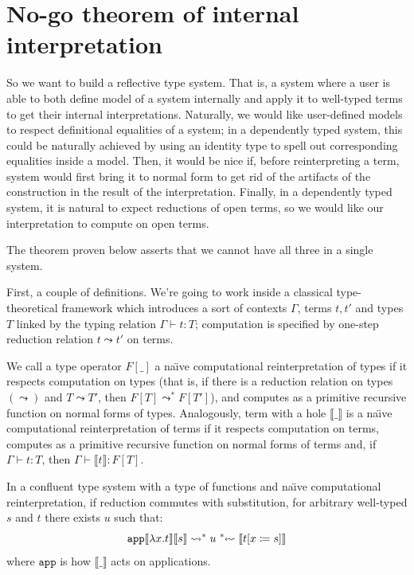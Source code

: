 \section{No-go theorem of internal interpretation}
\label{no-go-section}

So we want to build a reflective type system. That is,
a system where a user is able to both define model of a
system internally and apply it to well-typed terms to
get their internal interpretations. Naturally, we would
like user-defined models to respect definitional
equalities of a system; in a dependently typed system,
this could be naturally achieved by using an identity
type to spell out corresponding equalities inside a
model. Then, it would be nice if, before reinterpreting
a term, system would first bring it to normal form to
get rid of the artifacts of the construction in the
result of the interpretation. Finally, in a dependently
typed system, it is natural to expect reductions of open
terms, so we would like our interpretation to compute on
open terms.

The theorem proven below asserts that we cannot have all
three in a single system.

First, a couple of definitions. We're going to work
inside a classical type-theoretical framework which
introduces a sort of contexts $\Gamma$, terms $t,t'$ and
types $T$ linked by the typing relation
$\Gamma\vdash t:T$; computation is specified by one-step
reduction relation $t\leadsto t'$ on terms.

\begin{definition}
    We call a type operator $F[\_]$ a na\"{\i}ve
    computational reinterpretation of types if it
    respects computation on types (that is, if there is
    a reduction relation on types $(\leadsto)$ and
    $T\leadsto T'$, then $F[T]\leadsto^* F[T']$), and
    computes as a primitive recursive function on normal
    forms of types. Analogously, term with a hole
    $\llbracket\_\rrbracket$ is a na\"{\i}ve
    computational reinterpretation of terms if it
    respects computation on terms, computes as a
    primitive recursive function on normal forms of
    terms and, if $\Gamma\vdash t:T$, then
    $\Gamma\vdash\llbracket t\rrbracket:F[T]$.
\end{definition}

\begin{theorem}
\label{no-go}
    In a confluent type system with a type of functions
    and na\"{\i}ve computational reinterpretation, if
    reduction commutes with substitution, for arbitrary
    well-typed $s$ and $t$ there exists $u$ such that:
    \[
        \mathtt{app}\llbracket\lambda x.t\rrbracket
        \llbracket s \rrbracket \leadsto^* u\;
        \text{\reflectbox{$\leadsto^*$}}\;
        \llbracket t[x\coloneqq s] \rrbracket
    \]
    where $\mathtt{app}$ is how $\llbracket\_\rrbracket$
    acts on applications.
\end{theorem}

